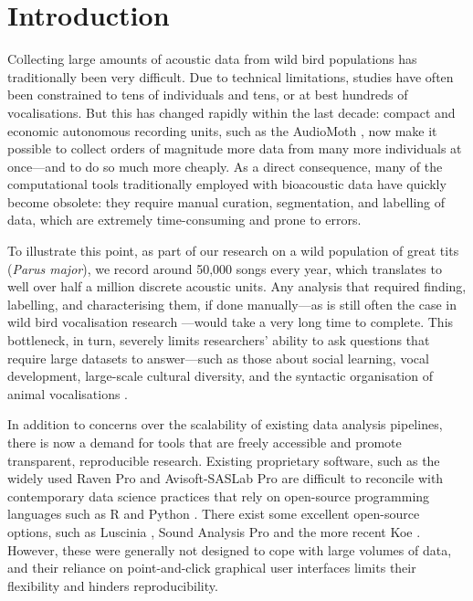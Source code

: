 \section{Introduction}

\lettrine[lines=2,slope=0pt, nindent=5pt]Collecting large amounts of acoustic data from wild bird populations has
traditionally been very difficult. Due to technical limitations, studies have
often been constrained to tens of individuals and tens, or at best hundreds of
vocalisations. But this has changed rapidly within the last decade: compact and
economic autonomous recording units, such as the AudioMoth \parencite{hill2019}, now
make it possible to collect orders of magnitude more data from many more
individuals at once---and to do so much more cheaply. As a direct consequence,
many of the computational tools traditionally employed with bioacoustic data
have quickly become obsolete: they require manual curation, segmentation, and
labelling of data, which are extremely time-consuming and prone to errors.

To illustrate this point, as part of our research on a wild population of great
tits (\textit{Parus major}), we record around 50,000 songs every year, which
translates to well over half a million discrete acoustic units. Any analysis
that required finding, labelling, and characterising them, if done manually---as
is still often the case in wild bird vocalisation research \parencite{beecher2020a,
demko2018, mclean2020, pipek2018, youngblood2022}---would take a very long time to
complete. This bottleneck, in turn, severely limits researchers' ability to ask
questions that require large datasets to answer---such as those about social
learning, vocal development, large-scale cultural diversity, and the syntactic
organisation of animal vocalisations \parencite{aplin2019, kollmorgen2020,
lachlan2018, sainburg2019}.

In addition to concerns over the scalability of existing data analysis
pipelines, there is now a demand for tools that are freely accessible and
promote transparent, reproducible research. Existing proprietary software, such
as the widely used Raven Pro \cite[up to \$800,][]{raven2019} and Avisoft-SASLab
Pro \parencite[up to \$2,835,][]{specht2002} are difficult to reconcile with
contemporary data science practices that rely on open-source programming
languages such as R \parencite{rcoreteam2021} and Python \parencite{vanrossum1995}.
There exist some excellent open-source options, such as Luscinia
\parencite{lachlan2016a}, Sound Analysis Pro \parencite{tchernichovski2000} and the more
recent Koe \parencite{fukuzawa2020}. However, these were generally not designed to
cope with large volumes of data, and their reliance on point-and-click graphical
user interfaces limits their flexibility and hinders reproducibility.

